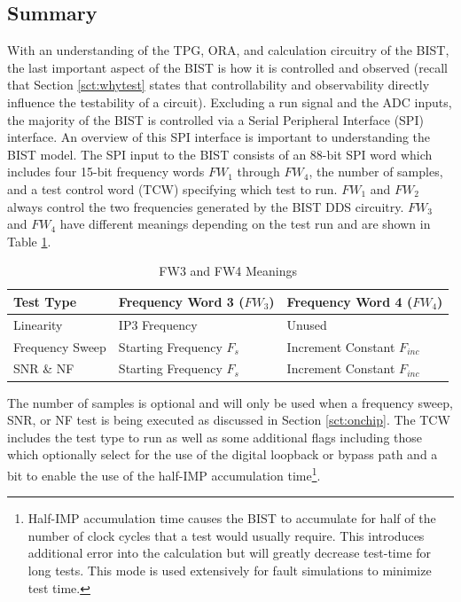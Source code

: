 \documentclass[12pt]{report}
\begin{document}
\subsection{Summary}
\label{sct:bkgsum}
With an understanding of the TPG, ORA, and calculation circuitry of the BIST, the last important aspect of the BIST is how it is controlled and observed (recall that Section \ref{sct:whytest} states that controllability and observability directly influence the testability of a circuit).  Excluding a run signal and the ADC inputs, the majority of the BIST is controlled via a Serial Peripheral Interface (SPI) interface.  An overview of this SPI interface is important to understanding the BIST model.  The SPI input to the BIST consists of an 88-bit SPI word which includes four 15-bit frequency words $FW_1$ through $FW_4$, the number of samples, and a test control word (TCW) specifying which test to run.  $FW_1$ and $FW_2$ always control the two frequencies generated by the BIST DDS circuitry.  $FW_3$ and $FW_4$ have different meanings depending on the test run and are shown in Table \ref{tbl:fw34}.  
\begin{table}
  \caption{FW3 and FW4 Meanings}
  \begin{center}
    \begin{tabular}{|l|l|l|}
      \hline
      Test Type & Frequency Word 3 ($FW_3$) & Frequency Word 4 ($FW_4$) \\ \hline
      Linearity & IP3 Frequency & Unused \\ \hline
      Frequency Sweep & Starting Frequency $F_s$ & Increment Constant $F_{inc}$ \\ \hline
      SNR \& NF & Starting Frequency $F_s$ & Increment Constant $F_{inc}$ \\ \hline
    \end{tabular}
  \end{center}
  \label{tbl:fw34}
\end{table}
The number of samples is optional and will only be used when a frequency sweep, SNR, or NF test is being executed as discussed in Section \ref{sct:onchip}.  The TCW includes the test type to run as well as some additional flags including those which optionally select  for the use of the digital loopback or bypass path and a bit to enable the use of the half-IMP accumulation time\footnote{Half-IMP accumulation time causes the BIST to accumulate for half of the number of clock cycles that a test would usually require.  This introduces additional error into the calculation but will greatly decrease test-time for long tests\cite{jie-journal}.  This mode is used extensively for fault simulations to minimize test time.}.  
\end{document}
